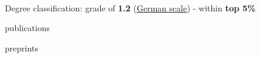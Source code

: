 \documentclass[]{lukas-cv-openfont}
\begin{document}
\noindent
{}
\\
\begin{tightitemize}{1.7em}
    \item Degree classification: grade of \textbf{1.2} (\href{https://en.wikipedia.org/wiki/Academic_grading_in_Germany}{German scale}) - within \textbf{top 5\%}%
\end{tightitemize}

\largesectionsep


\noindent
{}
\vspace{-1.4em}
\begin{btSect}{publications}
    \btPrintNotCited
\end{btSect}
\sectionsep

\noindent
{}
\vspace{-1.4em}
\begin{btSect}{preprints}
    \btPrintNotCited
\end{btSect}
\sectionsep


\end{document}

